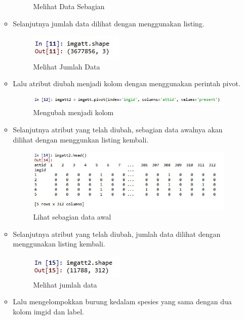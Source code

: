 \begin{enumerate}
\begin{itemize}
\begin{figure}[ht]
			\caption{Melihat Data Sebagian}
			\label{contoh}
			\end{figure}
		\item Selanjutnya jumlah data dilihat dengan menggunakan listing.
			\begin{figure}[ht]
			\centering
			\includegraphics[scale=0.5]{figures/k43.jpg}
			\caption{Melihat Jumlah Data}
			\label{contoh}
			\end{figure}
		\item Lalu atribut diubah menjadi kolom dengan menggunakan perintah pivot.
			\begin{figure}[ht]
			\centering
			\includegraphics[scale=0.5]{figures/k44.jpg}
			\caption{Mengubah menjadi kolom}
			\label{contoh}
			\end{figure}
		\item Selanjutnya atribut yang telah diubah, sebagian data awalnya akan dilihat dengan menggunkan listing kembali.
			\begin{figure}[ht]
			\centering
			\includegraphics[scale=0.5]{figures/k45.jpg}
			\caption{Lihat sebagian data awal}
			\label{contoh}
			\end{figure}
		\item Selanjutnya atribut yang telah diubah, jumlah data dilihat dengan menggunakan listing kembali.
			\begin{figure}[ht]
			\centering
			\includegraphics[scale=0.5]{figures/k46.jpg}
			\caption{Melihat jumlah data}
			\label{contoh}
			\end{figure}
		\item Lalu mengelompokkan burung kedalam spesies yang sama dengan dua kolom imgid dan label.

\end{itemize}
\end{enumerate}
